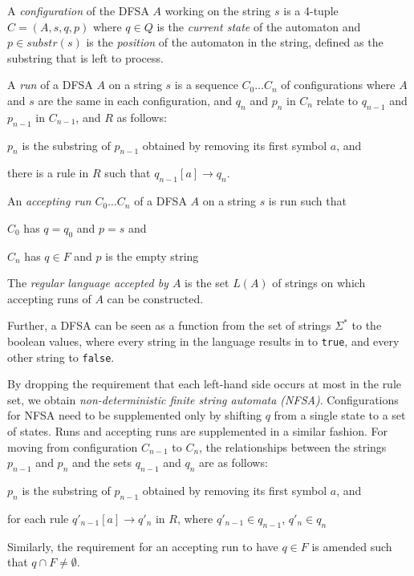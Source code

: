 A \emph{configuration} of the DFSA $A$ working on the string $s$ is a 4-tuple
$C = (A, s, q, p)$ where $q \in Q$ is the \emph{current state} of the
automaton and $p \in substr(s)$ is the \emph{position} of the automaton in
the string, defined as the substring that is left to process.

A \emph{run} of a DFSA $A$ on a string $s$ is a sequence $C_0 \ldots C_n$ of
configurations where $A$ and $s$ are the same in each configuration, and
$q_n$ and $p_n$ in $C_n$ relate to $q_{n-1}$ and $p_{n-1}$ in $C_{n-1}$,
and $R$ as follows:
\begin{compactitem}
\item $p_n$ is the substring of $p_{n-1}$ obtained by removing its first symbol
$a$, and
\item there is a rule in $R$ such that
$q_{n-1}[a] \rightarrow q_n$.
\end{compactitem}
\vspace{0.5cm}

An \emph{accepting run} $C_0 \ldots C_n$ of a DFSA $A$ on a string $s$ is run such that
\begin{compactitem}
\item $C_0$ has $q = q_0$ and $p = s$ and
\item $C_n$ has $q \in F$ and $p$ is the empty string
\end{compactitem}
\vspace{0.5cm}

The \emph{regular language accepted by $A$} is the set $L(A)$ of strings on
which accepting runs of $A$ can be constructed.

Further, a DFSA can be seen as a function from the set of strings
$\Sigma^*$ to the boolean values, where every string in the language
results in to \texttt{true}, and every other string to \texttt{false}.

By dropping the requirement that each left-hand side occurs at most in the
rule set, we obtain \emph{non-deterministic finite string automata (NFSA)}.
Configurations for NFSA need to be supplemented only by shifting $q$ from a
single state to a set of states. Runs and accepting runs are supplemented
in a similar fashion. For moving from configuration $C_{n-1}$ to $C_n$, the
relationships between the strings $p_{n-1}$ and $p_n$ and the sets
$q_{n-1}$ and $q_n$ are as follows:
\begin{compactitem}
\item $p_n$ is the substring of $p_{n-1}$ obtained by removing its first symbol
$a$, and
\item for each rule 
$q'_{n-1}[a] \rightarrow q'_n$
in $R$, where $q'_{n-1} \in q_{n-1}$, $q'_n \in q_n$
\end{compactitem}
Similarly, the requirement for an accepting run to have $q \in F$ is
amended such that $q \cap F \neq \emptyset$.

